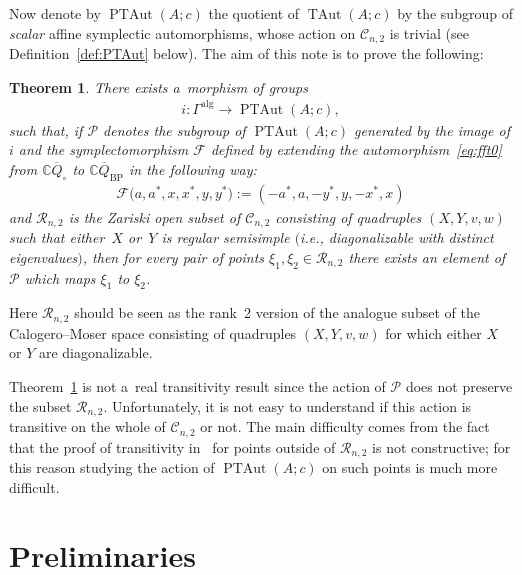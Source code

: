 \documentclass[11pt]{article}
\newtheorem{theorem}{Theorem}
\newcommand{\p}[1]{\left(#1\right)}
\newcommand{\bb}[1]{\mathbb{#1}}
\newcommand{\app}[3]{#1\colon #2\to #3}
\newcommand{\ol}[1]{\overline{#1}}
\DeclareMathOperator{\TAut}{TAut}
\DeclareMathOperator{\PTAut}{PTAut}
\begin{document}
Now denote by \(\PTAut(A;c)\) the quotient of \(\TAut(A;c)\) by the subgroup of \emph{scalar} af\/f\/ine
symplectic automorphisms, whose action on \(\mathcal{C}_{n,2}\) is trivial (see
Def\/inition~\ref{def:PTAut} below).
The aim of this note is to prove the following:
\begin{theorem}
\label{teo:result}
There exists a~morphism of groups
\begin{gather}
\label{eq:map}
\app{i}{\Gamma^{\mathrm{alg}}}{\PTAut(A;c)},
\end{gather}
such that, if \(\mathcal{P}\) denotes the subgroup of \(\PTAut(A;c)\) generated by the image of \(i\) and
the symplectomorphism \(\mathcal{F}\) defined by extending the automorphism~\eqref{eq:fft0} from
\(\bb{C}\ol{Q}_{\circ}\) to \(\bb{C}\ol{Q}_{\mathrm{BP}}\) in the following way:
\begin{gather}
\label{eq:def-fft}
\mathcal{F}\big(a,a^{*},x,x^{*},y,y^{*}\big)\mathrel{:=}(-a^{*},a,-y^{*},y,-x^{*},x)
\end{gather}
and \(\mathcal{R}_{n,2}\) is the Zariski open subset of \(\mathcal{C}_{n,2}\) consisting of quadruples
\(\p{X,Y,v,w}\) such that either~\(X\) or~\(Y\) is regular semisimple $($i.e., diagonalizable with distinct
eigenvalues$)$, then for every pair of points \(\xi_1,\xi_2\in \mathcal{R}_{n,2}\) there exists an element of
\(\mathcal{P}\) which maps \(\xi_1\) to \(\xi_2\).
\end{theorem}

Here \(\mathcal{R}_{n,2}\) should be seen as the rank~2 version of the analogue subset of the
Calogero--Moser space consisting of quadruples \((X,Y,v,w)\) for which either \(X\) or \(Y\) are
diagonalizable.

\begin{remark}
Theorem~\ref{teo:result} is not a~real transitivity result since the action of \(\mathcal{P}\) does not
preserve the subset \(\mathcal{R}_{n,2}\).
Unfortunately, it is not easy to understand if this action is transitive on the whole of
\(\mathcal{C}_{n,2}\) or not.
The main dif\/f\/iculty comes from the fact that the proof of transitivity in~\cite{bp08} for points
outside of \(\mathcal{R}_{n,2}\) is not constructive; for this reason studying the action of
\(\PTAut(A;c)\) on such points is much more dif\/f\/icult.
\end{remark}

\section{Preliminaries}
\end{document}
